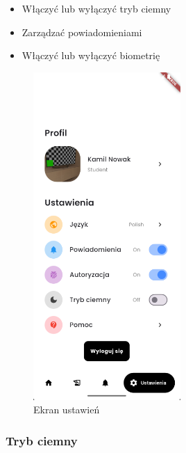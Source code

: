 \begin{itemize}
	\item Włączyć lub wyłączyć tryb ciemny
	\item Zarządzać powiadomieniami
	\item Włączyć lub wyłączyć biometrię
\end{itemize}
\begin{figure}[htb!]
	\centering
	\includegraphics[width=0.5\textwidth]{rys/ekranustawien.png}
	\caption{Ekran ustawień}
	\label{rys:ekranustawien1}
\end{figure}
\newpage
\subsubsection{Tryb ciemny}

